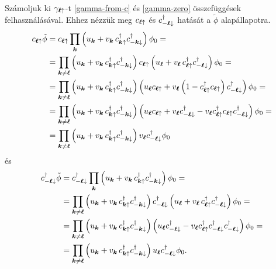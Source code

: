\documentclass[a4paper,12pt,titlepage]{article}
\newcommand{\KK}{{\vb*{k}}}
\newcommand{\LL}{{\vb*{\ell}}}
\begin{document}
Számoljuk ki $\gamma_{\LL \uparrow}$-t \eqref{gamma-from-c} és \eqref{gamma-zero} összefüggések felhasználásával.  Ehhez nézzük meg $c_{\LL \uparrow}$ és $c_{-\LL \downarrow}^\dagger$ hatását a $\tilde{\phi}$ alapállapotra.
\begin{equation}
\begin{split}
	c_{\LL \uparrow} \tilde{\phi} & = c_{\LL \uparrow} \prod\limits_\KK \left( u_\KK + v_\KK \, c_{\KK \uparrow}^\dagger c_{-\KK \downarrow}^\dagger \right) \phi_0 = \\
	& = \prod\limits_{\KK \neq \LL} \left( u_\KK + v_\KK \, c_{\KK \uparrow}^\dagger c_{-\KK \downarrow}^\dagger \right) c_{\LL \uparrow} \left( u_\LL + v_\LL \, c_{\LL \uparrow}^\dagger c_{-\LL \downarrow}^\dagger \right) \phi_0 = \\
	& = \prod\limits_{\KK \neq \LL} \left( u_\KK + v_\KK \, c_{\KK \uparrow}^\dagger c_{-\KK \downarrow}^\dagger \right) \left( u_\LL c_{\LL \uparrow} + v_\LL \left( 1 - c_{\LL \uparrow}^\dagger c_{\LL \uparrow} \right) c_{-\LL \downarrow}^\dagger \right) \phi_0 = \\
	& = \prod\limits_{\KK \neq \LL} \left( u_\KK + v_\KK \, c_{\KK \uparrow}^\dagger c_{-\KK \downarrow}^\dagger \right) \left( u_\LL c_{\LL \uparrow} + v_\LL c_{-\LL \downarrow}^\dagger - v_\LL c_{\LL \uparrow}^\dagger c_{\LL \uparrow} c_{-\LL \downarrow}^\dagger \right) \phi_0 = \\
	& = \prod\limits_{\KK \neq \LL} \left( u_\KK + v_\KK \, c_{\KK \uparrow}^\dagger c_{-\KK \downarrow}^\dagger \right) v_\LL c_{-\LL \downarrow}^\dagger \phi_0
\end{split}
\end{equation}
és
\begin{equation}
\begin{split}
	c_{-\LL \downarrow}^\dagger \tilde{\phi} & = c_{-\LL \downarrow}^\dagger \prod\limits_\KK \left( u_\KK + v_\KK \, c_{\KK \uparrow}^\dagger c_{-\KK \downarrow}^\dagger \right) \phi_0 = \\
	& = \prod\limits_{\KK \neq \LL} \left( u_\KK + v_\KK \, c_{\KK \uparrow}^\dagger c_{-\KK \downarrow}^\dagger \right) c_{-\LL \downarrow}^\dagger \left( u_\LL + v_\LL \, c_{\LL \uparrow}^\dagger c_{-\LL \downarrow}^\dagger \right) \phi_0 = \\
	& = \prod\limits_{\KK \neq \LL} \left( u_\KK + v_\KK \, c_{\KK \uparrow}^\dagger c_{-\KK \downarrow}^\dagger \right) \left( u_\LL c_{-\LL \downarrow}^\dagger - v_\LL c_{\LL \uparrow}^\dagger c_{-\LL \downarrow}^\dagger c_{-\LL \downarrow}^\dagger \right) \phi_0 = \\
	& = \prod\limits_{\KK \neq \LL} \left( u_\KK + v_\KK \, c_{\KK \uparrow}^\dagger c_{-\KK \downarrow}^\dagger \right) u_\LL c_{-\LL \downarrow}^\dagger \phi_0.
\end{split}
\end{equation}
\end{document}
